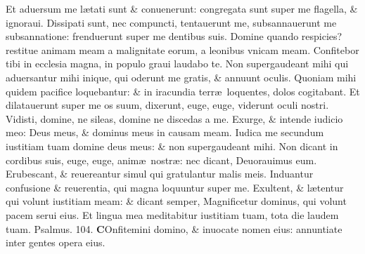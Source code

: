 \documentclass[a5paper,10pt]{book}
\def\ae{æ}
\begin{document}
\begin{multicols*}{2}
\newline \color{red} E\color{black}t aduersum me l\ae tati sunt \& conuenerunt: congregata sunt super me flagella, \& ignoraui.
\newline \color{red} D\color{black}issipati sunt, nec compuncti, tentauerunt me, subsannauerunt me subsannatione: frenduerunt super me dentibus suis.
\newline \color{red} D\color{black}omine quando respicies? restitue animam meam a malignitate eorum, a leonibus vnicam meam.
\newline \color{red} C\color{black}onfitebor tibi in ecclesia magna, in populo graui laudabo te.
\newline \color{red} N\color{black}on supergaudeant mihi qui aduersantur mihi inique, qui oderunt me gratis, \& annuunt oculis.
\newline \color{red} Q\color{black}uoniam mihi quidem pacifice loquebantur: \& in iracundia terr\ae \ loquentes, dolos cogitabant.
\newline \color{red} E\color{black}t dilatauerunt super me os suum, dixerunt, euge, euge, viderunt oculi nostri.
\newline \color{red} V\color{black}idisti, domine, ne sileas, domine ne discedas a me.
\newline \color{red} E\color{black}xurge, \& intende iudicio meo: Deus meus, \& dominus meus in causam meam.
\newline \color{red} I\color{black}udica me secundum iustitiam tuam domine deus meus: \& non supergaudeant mihi.
\newline \color{red} N\color{black}on dicant in cordibus suis, euge, euge, anim\ae \ nostr\ae : nec dicant, Deuorauimus eum.
\newline \color{red} E\color{black}rubescant, \& reuereantur simul qui gratulantur malis meis.
\newline \color{red} I\color{black}nduantur confusione \& reuerentia, qui magna loquuntur super me.
\newline \color{red} E\color{black}xultent, \& l\ae tentur qui volunt iustitiam meam: \& dicant semper, Magnificetur dominus, qui volunt pacem serui eius.
\newline \color{red} E\color{black}t lingua mea meditabitur iustitiam tuam, tota die laudem tuam.
\newline \color{red} Psalmus. \hypertarget{ps104}{104.} \color{black}
\vspace{-.5em}
\lettrine[lines=2]{\bfseries \color{red} C}{}Onfitemini domino, \& inuocate nomen eius: annuntiate inter gentes opera eius.

\end{multicols*}
\end{document}
